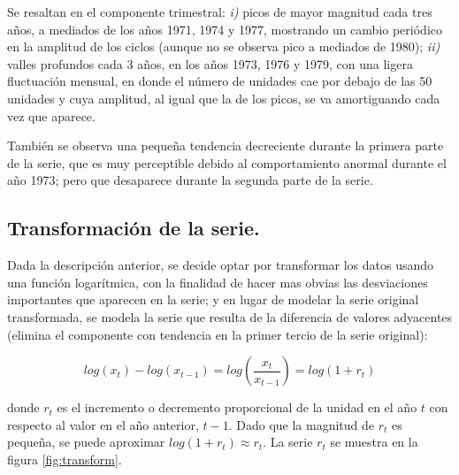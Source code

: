 \documentclass[]{article}
\begin{document}
Se resaltan en el componente trimestral:
\emph{i)} picos de mayor magnitud cada tres años, a mediados de los años 1971, 1974 y 1977, mostrando un cambio periódico en la amplitud de los ciclos (aunque no se observa pico a mediados de 1980);
\emph{ii)} valles profundos cada 3 años, en los años 1973, 1976 y 1979, con una ligera fluctuación mensual, en donde el número de unidades cae por debajo de las 50 unidades y cuya amplitud, al igual que la de los picos, se va amortiguando cada vez que aparece.

También se observa una pequeña tendencia decreciente durante la primera parte de la serie, que es muy perceptible debido al comportamiento anormal durante el año 1973; pero que desaparece durante la segunda parte de la serie.

\hypertarget{transformaciuxf3n-de-la-serie.}{%
\subsection{Transformación de la serie.}\label{transformaciuxf3n-de-la-serie.}}

Dada la descripción anterior, se decide optar por transformar los datos usando una función logarítmica, con la finalidad de hacer mas obvias las desviaciones importantes que aparecen en la serie; y en lugar de modelar la serie original transformada, se modela la serie que resulta de la diferencia de valores adyacentes (elimina el componente con tendencia en la primer tercio de la serie original):

\[log(x_t) - log(x_{t-1}) = log(\frac{x_t}{x_{t-1}}) = log(1 + r_t)\]

donde \(r_t\) es el incremento o decremento proporcional de la unidad en el año \(t\) con respecto al valor en el año anterior, \(t-1\). Dado que la magnitud de \(r_t\) es pequeña, se puede aproximar \(log(1 + r_t) \approx r_t\). La serie \(r_t\) se muestra en la figura \ref{fig:transform}.
\end{document}
